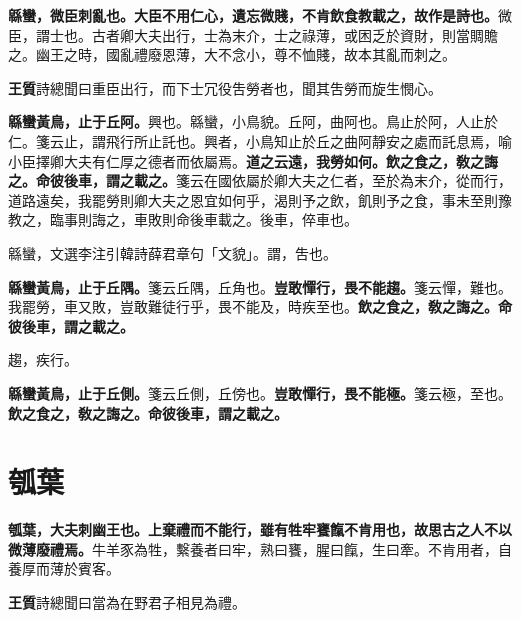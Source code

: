 
\textbf{緜蠻，微臣刺亂也。大臣不用仁心，遺忘微賤，不肯飲食教載之，故作是詩也。}{\footnotesize 微臣，謂士也。古者卿大夫出行，士為末介，士之祿薄，或困乏於資財，則當賙贍之。幽王之時，國亂禮廢恩薄，大不念小，尊不恤賤，故本其亂而刺之。}

\begin{quoting}\textbf{王質}詩總聞曰重臣出行，而下士冗役吿勞者也，聞其吿勞而旋生憫心。\end{quoting}

\textbf{緜蠻黃鳥，止于丘阿。}{\footnotesize 興也。緜蠻，小鳥貌。丘阿，曲阿也。鳥止於阿，人止於仁。箋云止，謂飛行所止託也。興者，小鳥知止於丘之曲阿靜安之處而託息焉，喻小臣擇卿大夫有仁厚之德者而依屬焉。}\textbf{道之云遠，我勞如何。飲之食之，敎之誨之。命彼後車，謂之載之。}{\footnotesize 箋云在國依屬於卿大夫之仁者，至於為末介，從而行，道路遠矣，我罷勞則卿大夫之恩宜如何乎，渴則予之飲，飢則予之食，事未至則豫教之，臨事則誨之，車敗則命後車載之。後車，倅車也。}

\begin{quoting}緜蠻，文選李注引韓詩薛君章句「文貌」。謂，吿也。\end{quoting}

\textbf{緜蠻黃鳥，止于丘隅。}{\footnotesize 箋云丘隅，丘角也。}\textbf{豈敢憚行，畏不能趨。}{\footnotesize 箋云憚，難也。我罷勞，車又敗，豈敢難徒行乎，畏不能及，時疾至也。}\textbf{飲之食之，敎之誨之。命彼後車，謂之載之。}

\begin{quoting}趨，疾行。\end{quoting}

\textbf{緜蠻黃鳥，止于丘側。}{\footnotesize 箋云丘側，丘傍也。}\textbf{豈敢憚行，畏不能極。}{\footnotesize 箋云極，至也。}\textbf{飲之食之，敎之誨之。命彼後車，謂之載之。}

\section{瓠葉}


\textbf{瓠葉，大夫刺幽王也。上棄禮而不能行，雖有牲牢饔餼不肯用也，故思古之人不以微薄廢禮焉。}{\footnotesize 牛羊豕為牲，繫養者曰牢，熟曰饔，腥曰餼，生曰牽。不肯用者，自養厚而薄於賓客。}

\begin{quoting}\textbf{王質}詩總聞曰當為在野君子相見為禮。\end{quoting}

